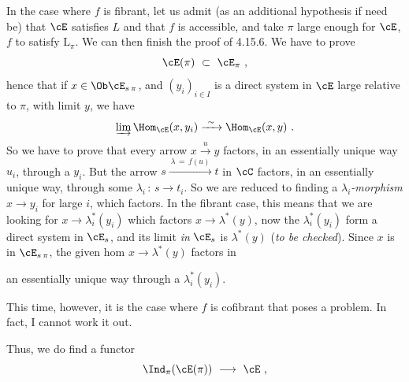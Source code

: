 In the case where $f$ is fibrant, let us admit (as an additional hypothesis if need be) that $\cE$ satisfies $L$ and that $f$ is accessible, and take $\pi$ large enough for $\cE$, $f$ to satisfy $\mathrm{L}_{\pi}$. We can then finish the proof of 4.15.6. We have to prove
\[
\cE(\pi) \ \subset \ \cE_{\pi} \ ,
\]
hence that if $x \in \Ob \cE_{s\,\pi}$, and $(y_i)_{i \in I}$ is a direct system in $\cE$ large relative to $\pi$, with limit $y$, we have
\[
\varinjlim \Hom_{\cE}(x, y_i) \xrightarrow{\ \sim\ } \Hom_{\cE}(x, y) \ .
\]
So we have to prove that every arrow $x \xrightarrow{u} y$ factors, in an essentially unique way $u_i$, through a $y_i$. But the arrow $s \xrightarrow{\ \lambda \, = \, f(u)\ } t$ in $\cC$ factors, in an essentially unique way, through some $\lambda_i \, : \, s \longrightarrow t_i$. So we are reduced to finding a \textit{$\lambda_i$-morphism} $x \longrightarrow y_i$ for large $i$, which factors. In the fibrant case, this means that we are looking for $x \longrightarrow \lambda^*_i(y_i)$ which factors $x \longrightarrow \lambda^*(y)$, now the $\lambda^*_i(y_i)$ form a direct system in $\cE_s$, and its limit \textit{in} $\cE_s$ is $\lambda^*(y)$ (\textit{to be checked}). Since $x$ is in $\cE_{s\,\pi}$, the given hom $x \longrightarrow \lambda^*(y)$ factors in

an essentially unique way through a $\lambda^*_i(y_i)$.

This time, however, it is the case where $f$ is cofibrant that poses a problem. In fact, I cannot work it out.

Thus, we do find a functor
\[
\Ind_{\pi}(\cE(\pi)) \ \longrightarrow \ \cE \ ,
\]